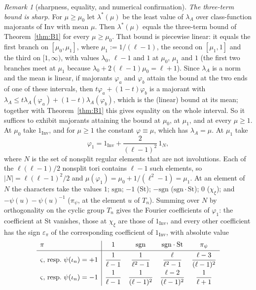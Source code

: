 \documentclass[11pt]{amsart}
\theoremstyle{definition}
\theoremstyle{remark}
\newtheorem{remark}[theorem]{Remark}
\newcommand{\Inv}{\mathrm{Inv}}
\begin{document}
\begin{remark}[sharpness, equality, and numerical confirmation]\label{rem:B1-num}
\emph{The three-term bound is sharp.} For $\mu\ge\mu_0$ let $\lambda^*(\mu)$ be the least value of $\lambda_A$ over
class-function majorants of $\Inv$ with mean $\mu$. Then $\lambda^*(\mu)$ equals the three-term bound of
Theorem~\ref{thm:B1} for every $\mu\ge\mu_0$. That bound is piecewise linear: it equals the first branch on
$[\mu_0,\mu_1]$, where $\mu_1:=1/(\ell-1)$, the second on $[\mu_1,1]$ and the third on $[1,\infty)$, with values
$\lambda_0$, $\ell-1$ and $1$ at $\mu_0$, $\mu_1$ and $1$ (the first two branches meet at $\mu_1$ because
$\lambda_0+2(\ell-1)\mu_0=\ell+1$). Since $\lambda_A$ is a norm and the mean is linear, if majorants $\varphi_a$ and
$\varphi_b$ attain the bound at the two ends of one of these intervals, then $t\varphi_a+(1-t)\varphi_b$ is a majorant
with $\lambda_A\le t\lambda_A(\varphi_a)+(1-t)\lambda_A(\varphi_b)$, which is the (linear) bound at its mean; together
with Theorem~\ref{thm:B1} this gives equality on the whole interval. So it suffices to exhibit majorants attaining the
bound at $\mu_0$, at $\mu_1$, and at every $\mu\ge1$. At $\mu_0$ take $1_{\Inv}$, and for $\mu\ge1$ the constant
$\varphi\equiv\mu$, which has $\lambda_A=\mu$. At $\mu_1$ take
\[
  \varphi_1=1_{\Inv}+\frac{2}{(\ell-1)^2}\,1_{N},
\]
where $N$ is the set of nonsplit regular elements that are not involutions. Each of the $\ell(\ell-1)/2$ nonsplit tori
contains $\ell-1$ such elements, so $|N|=\ell(\ell-1)^2/2$ and $\mu(\varphi_1)=\mu_0+1/(\ell^2-1)=\mu_1$. At an element of
$N$ the characters take the values $1$; $\mathrm{sgn}$; $-1$ (St); $-\mathrm{sgn}$ ($\mathrm{sgn}\cdot\mathrm{St}$);
$0$ ($\chi_\xi$); and $-\psi(u)-\psi(u)^{-1}$ ($\pi_\psi$, at the element $u$ of $T_n$). Summing over $N$ by orthogonality
on the cyclic group $T_n$ gives the Fourier coefficients of $\varphi_1$: the coefficient at St vanishes, those at
$\chi_\xi$ are those of $1_{\Inv}$, and every other coefficient has the sign $\varepsilon_\pi$ of the corresponding
coefficient of $1_{\Inv}$, with absolute value
\[
  \begin{array}{l|cccc}
    \pi & 1 & \mathrm{sgn} & \mathrm{sgn}\cdot\mathrm{St} & \pi_\psi\\[2pt] \hline\rule{0pt}{16pt}
    \varsigma\text{, resp.\ }\psi(\iota_n)=+1 & \dfrac1{\ell-1} & \dfrac1{\ell^2-1} & \dfrac{\ell}{\ell^2-1} & \dfrac{\ell-3}{(\ell-1)^2}\\[8pt]
    \varsigma\text{, resp.\ }\psi(\iota_n)=-1 & \dfrac1{\ell-1} & \dfrac1{(\ell-1)^2} & \dfrac{\ell-2}{(\ell-1)^2} & \dfrac1{\ell+1}

\end{array}\]
\end{remark}
\end{document}
